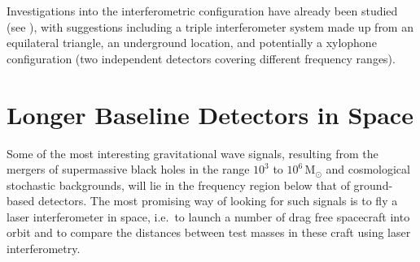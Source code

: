\documentclass{article}
\begin{document}
Investigations into the interferometric configuration have already been studied
(see \cite{Freise:2008, Hild:2008}), with suggestions including a triple
interferometer system made up from an equilateral triangle, an underground
location, and potentially a xylophone configuration (two independent detectors
covering different frequency ranges).





\newpage

\section{Longer Baseline Detectors in Space}
\label{section:space}

Some of the most interesting gravitational wave signals, resulting from the
mergers of supermassive black holes in the range $10^3$ to $10^6$\,M$_{\odot}$
and cosmological stochastic backgrounds, will lie in the frequency region below
that of ground-based detectors. The most promising way of looking for such
signals is to fly a laser interferometer in space, i.e.\ to launch a number of
drag free spacecraft into orbit and to compare the distances between test
masses in these craft using laser interferometry.
\end{document}
